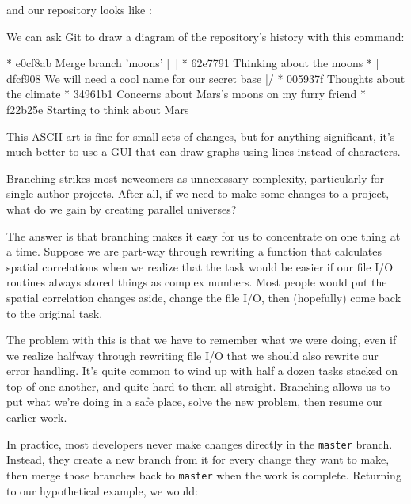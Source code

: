 and our repository looks like :


We can ask Git to draw a diagram of the repository's history with this
command:


\begin{VerbOut}
*   e0cf8ab Merge branch 'moons'
|\
| * 62e7791 Thinking about the moons
* | dfcf908 We will need a cool name for our secret base
|/
* 005937f Thoughts about the climate
* 34961b1 Concerns about Mars's moons on my furry friend
* f22b25e Starting to think about Mars
\end{VerbOut}

This ASCII art is fine for small sets of changes, but for anything
significant, it's much better to use a GUI that can draw graphs using
lines instead of characters.

Branching strikes most newcomers as unnecessary complexity, particularly
for single-author projects. After all, if we need to make some changes
to a project, what do we gain by creating parallel universes?

The answer is that branching makes it easy for us to concentrate on one
thing at a time. Suppose we are part-way through rewriting a function
that calculates spatial correlations when we realize that the task would
be easier if our file I/O routines always stored things as complex
numbers. Most people would put the spatial correlation changes aside,
change the file I/O, then (hopefully) come back to the original task.

The problem with this is that we have to remember what we were doing,
even if we realize halfway through rewriting file I/O that we should
also rewrite our error handling. It's quite common to wind up with half
a dozen tasks stacked on top of one another, and quite hard to them all
straight. Branching allows us to put what we're doing in a safe place,
solve the new problem, then resume our earlier work.

In practice, most developers never make changes directly in the
\texttt{master} branch. Instead, they create a new branch from it for
every change they want to make, then merge those branches back to
\texttt{master} when the work is complete. Returning to our hypothetical
example, we would:

